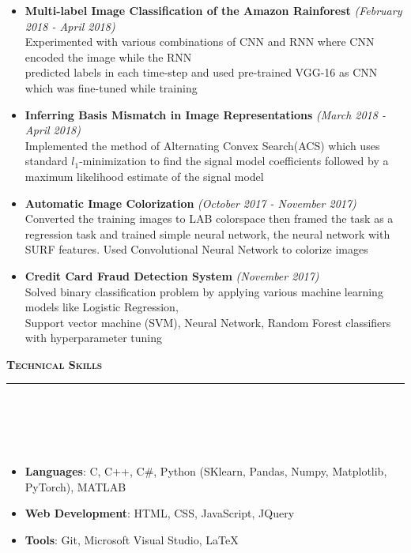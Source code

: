 \documentclass[a4paper,10pt]{article}
\newcommand{\lsep}{-0.5cm}
\newcommand{\resheading}[1]{{\small
        {
            \begin{minipage}
                {0.992\textwidth}\textbf{{\textsc{#1 \vphantom{p\^{E}} }}}
                \\[-0.3cm]
                \hrule
            \end{minipage}
            \\[-0.5cm]
        }
 }}
\begin{document}
\begin{itemize}

\item \textbf{Multi-label Image Classification of the Amazon Rainforest}   \hfill {\emph{(February 2018 - April 2018)}}
\\
Experimented with various combinations of CNN and RNN where CNN encoded the image while the RNN\\ predicted labels in each time-step and used pre-trained VGG-16 as CNN which was fine-tuned while training
\\[-0.6cm]
\item \textbf{Inferring Basis Mismatch in Image Representations} \hfill {\emph{(March 2018 - April 2018)}}
\\
Implemented the method of Alternating Convex Search(ACS) which uses standard $l_1$-minimization to find the signal model coefficients followed by a maximum likelihood estimate of the signal model
\\[-0.6cm]
\item \textbf{Automatic Image Colorization} \hfill {\emph{(October 2017 - November 2017)}}
\\
Converted the training images to LAB colorspace then framed the task as a regression task and trained simple neural network, the neural network with SURF features. Used Convolutional Neural Network to colorize images
\\[-0.6cm] 
\item \textbf{Credit Card Fraud Detection System} \hfill {\emph{(November 2017)}}
\\
Solved binary classification problem by applying various machine learning models like Logistic Regression, \\
Support vector machine (SVM), Neural Network, Random Forest classifiers with hyperparameter tuning
\\[-0.6cm]
\end{itemize}
\vspace{0.1cm}
\resheading{\textbf{\large Technical Skills}}\\[\lsep] 
\\[-0.3cm]
\begin{itemize}
  \item \textbf{Languages}: C, C++,  C\#, Python (SKlearn, Pandas, Numpy, Matplotlib, PyTorch), MATLAB\\[-0.6cm]
  \item \textbf{Web Development}: HTML, CSS,
  JavaScript, JQuery\\[-0.6cm]
  \item \textbf{Tools}: Git, Microsoft Visual Studio, \LaTeX \\[-0.6cm]
\end{itemize}
\end{document}
